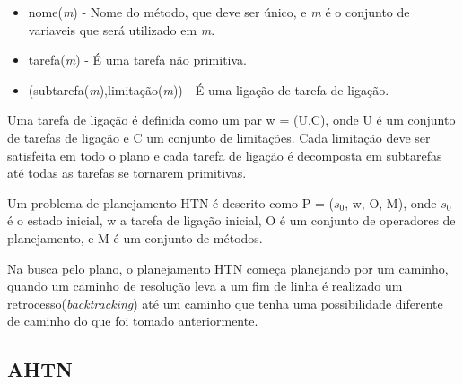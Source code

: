 \begin{itemize}
	\item nome(\textit{m}) - Nome do método, que deve ser único, e \textit{m} é o conjunto de variaveis que será utilizado em \textit{m}. 
	\item tarefa(\textit{m}) - É uma tarefa não primitiva.
	\item (subtarefa(\textit{m}),limitação(\textit{m})) - É uma ligação de tarefa de ligação.
\end{itemize}

Uma tarefa de ligação é definida como um par w = (U,C), onde U é um conjunto de tarefas de ligação e C um conjunto de limitações. Cada limitação deve ser satisfeita em todo o plano e cada tarefa de ligação é decomposta em subtarefas até todas as tarefas se tornarem primitivas. 

Um problema de planejamento HTN é descrito como P = ($s_{0}$, w, O, M), onde $s_{0}$ é o estado inicial, w a tarefa de ligação inicial, O é um conjunto de operadores de planejamento, e M é um conjunto de métodos. 

Na busca pelo plano, o planejamento HTN começa planejando por um caminho, quando um caminho de resolução leva a um fim de linha é realizado um retrocesso(\textit{backtracking}) até um caminho que tenha uma possibilidade diferente de caminho do que foi tomado anteriormente.


\subsection{AHTN} 

